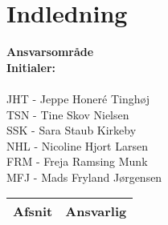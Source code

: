 \chapter{Indledning}


\textbf{Ansvarsområde} \\
\textbf{Initialer: } \\
\\
JHT - Jeppe Honeré Tinghøj\\
TSN - Tine Skov Nielsen\\
SSK - Sara Staub Kirkeby\\
NHL - Nicoline Hjort Larsen\\
FRM - Freja Ramsing Munk\\
MFJ - Mads Fryland Jørgensen\\

\begin{longtabu} to 
    Afsnit &    Ansvarlig\\[-1ex]
    \midrule
   
    
    
    

\end{longtabu}